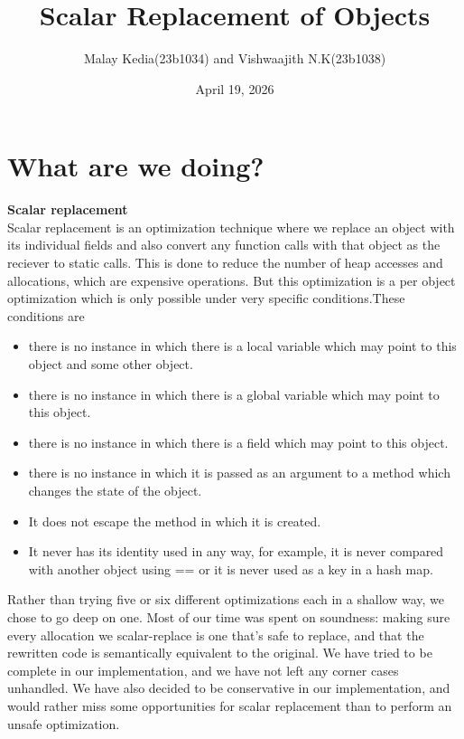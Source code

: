 \documentclass[12pt,a4paper]{article}
\title{Scalar Replacement of Objects}
\author{Malay Kedia(23b1034) and Vishwaajith N.K(23b1038)}
\date{April 19, 2026}
\begin{document}
\maketitle
\section{What are we doing?}
\textbf{Scalar replacement}\\
Scalar replacement is an optimization technique where we replace an object with its individual fields and also convert any function calls with that object as the reciever to static calls. This is done to reduce the number of heap accesses and allocations, which are expensive operations. But this optimization is a per object optimization which is only possible under very specific conditions.These conditions are 
\begin{itemize}
    \item there is no instance in which there is a local variable which may point to this object and some other object.
    \item there is no instance in which there is a global variable which may point to this object.
    \item there is no instance in which there is a field which may point to this object.
    \item there is no instance in which it is passed as an argument to a method which changes the state of the object.
    \item It does not escape the method in which it is created.
    \item It never has its identity used in any way, for example, it is never compared with another object using == or it is never used as a key in a hash map.
\end{itemize}

Rather than trying five or six different optimizations each in a shallow way, we chose to go deep on one. Most of our time was spent on soundness: making sure every allocation we scalar-replace is one that's safe to
replace, and that the rewritten code is semantically equivalent to the
original. We have tried to be complete in our implementation, and we have not left any corner cases unhandled. We have also decided to be conservative in our implementation, and would rather miss some opportunities for scalar replacement than to perform an unsafe optimization.

\end{document}
